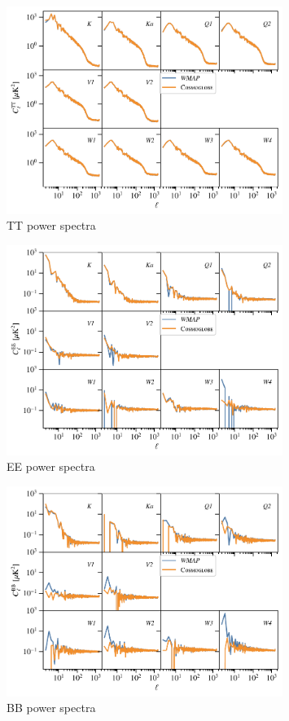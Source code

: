 \documentclass[twocolumn]{../../common/aa}
\begin{document}
\begin{figure}
	\centering
	\includegraphics[width=0.8\textwidth]{figures/TT_spectra.pdf}
	\caption{TT power spectra}
\end{figure}
\begin{figure}
	\centering
	\includegraphics[width=0.8\textwidth]{figures/EE_spectra.pdf}
	\caption{EE power spectra}
\end{figure}
\begin{figure}
	\centering
	\includegraphics[width=0.8\textwidth]{figures/BB_spectra.pdf}
	\caption{BB power spectra}
\end{figure}
\end{document}
